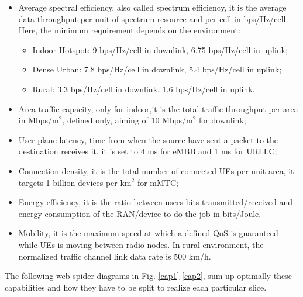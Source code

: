 \documentclass[a4paper,12pt]{report} %
\begin{document}
\begin{itemize}
\item Average spectral efficiency, also called spectrum efficiency, it is the average data
throughput per unit of spectrum resource and per cell in bps/Hz/cell. Here, the minimum requirement depends on the environment:
\begin{itemize}
\item Indoor Hotspot: 9 bps/Hz/cell in downlink, 6.75 bps/Hz/cell in uplink;
\end{itemize}
\begin{itemize}
\item Dense Urban: 7.8 bps/Hz/cell in downlink, 5.4 bps/Hz/cell in uplink;
\end{itemize}
\begin{itemize}
\item Rural: 3.3 bps/Hz/cell in downlink, 1.6 bps/Hz/cell in uplink.
\end{itemize}
\end{itemize}
\begin{itemize}
\item Area traffic capacity, only for indoor,it is the total traffic throughput per area in Mbps/m$^2$, defined only, aiming of 10 Mbps/m$^2$ for downlink;
\end{itemize}
\begin{itemize}
\item User plane latency, time from when the
source have sent a packet to the destination receives it, it is set to 4 ms for eMBB and 1 ms for URLLC;
\end{itemize}
\begin{itemize}
\item Connection density, it is the total number of connected UEs 
per unit area, it targets 1 billion devices per km$^2$ for mMTC;
\end{itemize}
\begin{itemize}
\item Energy efficiency, it is the ratio between users bits transmitted/received and energy consumption of the RAN/device to do the job in bits/Joule.
\end{itemize}
\begin{itemize}
\item Mobility, it is the maximum speed at which a defined QoS is guaranteed while UEs is moving between radio nodes. In rural environment, the normalized traffic channel link data rate is 500 km/h.
\end{itemize}
The following web-spider diagrams in Fig. \ref{cap1}-\ref{cap2}, sum up optimally these capabilities and how they have to be split to realize each particular slice. \cite{marsch20185g} \cite{etsi2018gs} \cite{idc} \cite{al20185g}
\end{document}
